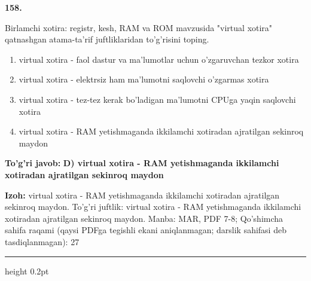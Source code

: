 \documentclass[10pt,a4paper]{article}
\begin{document}
{\bfseries\sffamily\color{ink} 158.}
\par
Birlamchi xotira: registr, kesh, RAM va ROM mavzusida "virtual xotira" qatnashgan atama-ta'rif juftliklaridan to'g'risini toping.
\begin{enumerate}[label=\Alph*),leftmargin=9mm]
\item virtual xotira - faol dastur va ma'lumotlar uchun o'zgaruvchan tezkor xotira
\item virtual xotira - elektrsiz ham ma'lumotni saqlovchi o'zgarmas xotira
\item virtual xotira - tez-tez kerak bo'ladigan ma'lumotni CPUga yaqin saqlovchi xotira
\item virtual xotira - RAM yetishmaganda ikkilamchi xotiradan ajratilgan sekinroq maydon
\end{enumerate}
\begin{tcolorbox}[enhanced,breakable,colback=teal!4,colframe=teal!60!black,boxrule=0.45pt,arc=1.2mm,left=2.7mm,right=2.7mm,top=1.8mm,bottom=1.8mm,before skip=2mm,after skip=2mm]
{\bfseries\sffamily\color{teal}To'g'ri javob:} \textbf{D) virtual xotira - RAM yetishmaganda ikkilamchi xotiradan ajratilgan sekinroq maydon}
\par\smallskip
{\bfseries Izoh:} virtual xotira - RAM yetishmaganda ikkilamchi xotiradan ajratilgan sekinroq maydon. To'g'ri juftlik: virtual xotira - RAM yetishmaganda ikkilamchi xotiradan ajratilgan sekinroq maydon. Manba: MAR, PDF 7-8; Qo'shimcha sahifa raqami (qaysi PDFga tegishli ekani aniqlanmagan; darslik sahifasi deb tasdiqlanmagan): 27
\end{tcolorbox}
\vspace{2mm}\hrule height 0.2pt\vspace{3mm}
\end{document}
